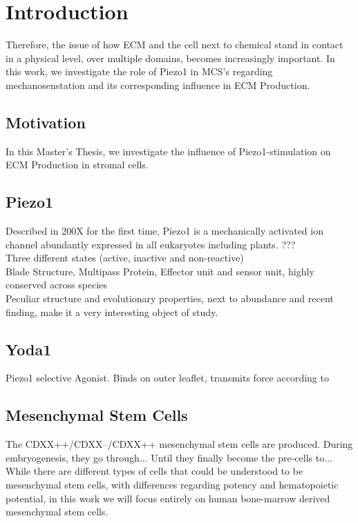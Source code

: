 \newcommand{\package}{\emph}


\chapter{Introduction}

Therefore, the issue of how ECM and the cell next to chemical stand in contact in a physical level, over multiple domains, becomes increasingly important. 
In this work, we investigate the role of Piezo1 in MCS's regarding mechanosenstation and its corresponding influence in ECM Production.


\section{Motivation}
\label{sec:motivation}

In this Master's Thesis, we investigate the influence of Piezo1-stimulation on ECM Production in stromal cells.

\section{Piezo1}
Described in 200X for the first time, Piezo1 is a  mechanically activated ion channel abundantly expressed in all eukaryotes including plants. ???\cite{Coste55} \\
Three different states (active, inactive and non-reactive)\\
Blade Structure, Multipass Protein, Effector unit and sensor unit, highly conserved across species\\
Peculiar structure and evolutionary properties, next to abundance and recent finding, make it a very interesting object of study. 

\section{Yoda1}
Piezo1 selective Agonist. Binds on outer leaflet, transmits force according to \cite{BotelloSmith.2019} 

\section{Mesenchymal Stem Cells}
The CDXX++/CDXX--/CDXX++ mesenchymal stem cells are produced. During embryogenesis, they go through... Until they finally become the pre-cells to...
While there are different types of cells that could be understood to be mesenchymal stem cells, with differences regarding potency and hematopoietic potential, in this work we will focus entirely on human bone-marrow derived mesenchymal stem cells. 


